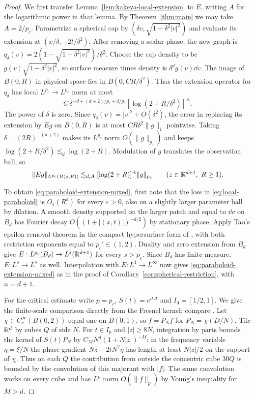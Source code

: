 \begin{proof}
We first transfer Lemma~\ref{lem:kakeya-local-extension} to $E$,
writing $A$ for the logarithmic power in that lemma. By
Theorem~\ref{thm:main} we may take $A=2/p_c$.
Parametrize a spherical cap by $(\delta v,\sqrt{1-\delta^2|v|^2})$
and evaluate its extension at $(x/\delta,-2t/\delta^2)$.
After removing a scalar phase, the new graph is
$q_\delta(v)=2(1-\sqrt{1-\delta^2|v|^2})/\delta^2$.
Choose the cap density to be $g(v)\sqrt{1-\delta^2|v|^2}$, so surface
measure times density is $\delta^d g(v)\dd v$. The image of $B(0,R)$
in physical space lies in $B(0,CR/\delta^2)$. Thus the extension
operator for $q_\delta$ has local $L^{p_c}\to L^{p_c}$ norm at most
\[
 C\,\delta^{-d+(d+2)/p_c+d/p_c}
       [\log(2+R/\delta^2)]^A .
\]
The power of $\delta$ is zero. Since
$q_\delta(v)=|v|^2+O(\delta^2)$, the error in replacing its extension
by $Eg$ on $B(0,R)$ is at most $C R\delta^2\|g\|_1$ pointwise.
Taking $\delta=(2R)^{-(d+2)}$ makes its $L^{p_c}$ norm
$O(\|g\|_{p_c})$ and keeps $\log(2+R/\delta^2)\lesssim_d\log(2+R)$.
Modulation of $g$ translates the observation ball, so
\begin{equation}\label{eq:local-paraboloid}
  \|Eg\|_{L^{p_c}(B(z,R))}
  \lesssim_{d,A} [\log(2+R)]^A\|g\|_{p_c}
  \qquad(z\in\mathbb R^{d+1},\ R\ge1).
\end{equation}

To obtain \eqref{eq:paraboloid-extension-mixed}, first note that the
loss in \eqref{eq:local-paraboloid} is $O_\varepsilon(R^\varepsilon)$
for every $\varepsilon>0$, also on a slightly larger parameter ball by
dilation. A smooth density supported on the larger patch and equal to
$\dd v$ on $B_d$ has Fourier decay $O((1+|(x,t)|)^{-d/2})$ by
stationary phase. Apply Tao's epsilon-removal theorem
\cite[Theorem~1.2]{Tao1999} in the compact hypersurface form of
\cite[Theorem~5.3]{Kim2017Restriction}, with both restriction
exponents equal to $p_c'\in(1,2)$. Duality and zero extension from
$B_d$ give $E:L^{p_c}(B_d)\to L^s(\mathbb R^{d+1})$ for every $s>p_c$.
Since $B_d$ has finite measure, $E:L^s\to L^s$ as well. Interpolation
with $E:L^1\to L^\infty$ now gives \eqref{eq:paraboloid-extension-mixed}
as in the proof of Corollary~\ref{cor:spherical-restriction}, with $n=d+1$.

For the critical estimate write $p=p_c$, $S(t)=e^{it\Delta}$ and
$I_0=[1/2,1]$. We give the finite-scale comparison directly from the
Fresnel kernel; compare \cite[Lemma~2.2]{LRS2013Schrodinger}.
Let $\chi\in C_c^\infty(B(0,2))$ equal one on $B(0,1)$, so
$f=P_N f$ for $P_N=\chi(D/N)$. Tile $\mathbb R^d$ by cubes $Q$ of side $N$.
For $t\in I_0$ and $|z|\ge8N$, integration by parts bounds the kernel
of $S(t)P_N$ by $C_M N^d(1+N|z|)^{-M}$: in the frequency variable
$\eta=\xi/N$ the phase gradient $Nz-2tN^2\eta$ has length at least
$N|z|/2$ on the support of $\chi$.
Thus on each $Q$ the contribution from outside the concentric cube
$30Q$ is bounded by the convolution of this majorant with $|f|$.
The same convolution works on every cube and has $L^p$ norm
$O(\|f\|_p)$ by Young's inequality for $M>d$.


\end{proof}
